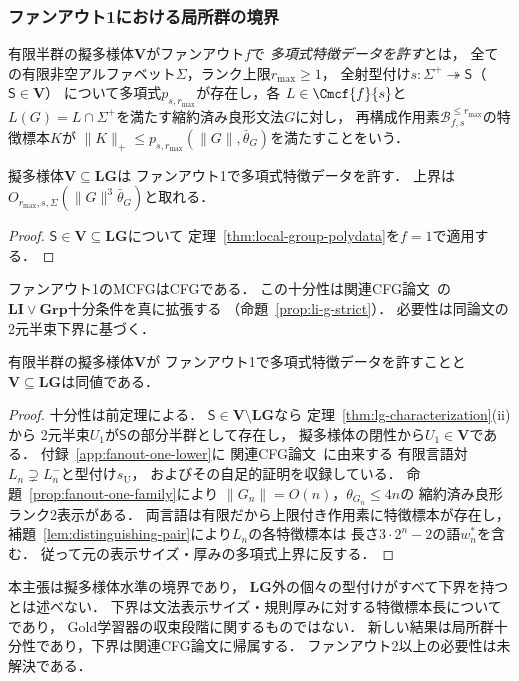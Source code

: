 \subsubsection{ファンアウト1における局所群の境界}
\label{subsec:fanout-one-boundary}
有限半群の擬多様体$\mathbf V$がファンアウト$f$で
\emph{多項式特徴データを許す}とは，
全ての有限非空アルファベット$\Sigma$，ランク上限$r_{\max}\ge1$，
全射型付け$s:\Sigma^+\twoheadrightarrow\mathsf S$（$\mathsf S\in\mathbf V$）
について多項式$p_{s,r_{\max}}$が存在し，各
$L\in\Cmcf{f}{s}$と
$L(G)=L\cap\Sigma^+$を満たす縮約済み良形文法$G$に対し，
再構成作用素$\mathcal B^{\le r_{\max}}_{f,s}$の特徴標本$K$が
$\|K\|_+\le p_{s,r_{\max}}(\|G\|,\bar\theta_G)$を満たすことをいう．

\begin{theorem}
\label{thm:fanout-one-lg}
擬多様体$\mathbf V\subseteq\mathbf{LG}$は
ファンアウト1で多項式特徴データを許す．
上界は$O_{r_{\max},s,\Sigma}(\|G\|^3\bar\theta_G)$と取れる．
\end{theorem}
\begin{proof}
$\mathsf S\in\mathbf V\subseteq\mathbf{LG}$について
定理~\ref{thm:local-group-polydata}を$f=1$で適用する．
\end{proof}
ファンアウト1のMCFGはCFGである．
この十分性は関連CFG論文~\cite{kuriyamaCFG}の
$\mathbf{LI}\vee\mathbf{Grp}$十分条件を真に拡張する
（命題~\ref{prop:li-g-strict}）．
必要性は同論文の2元半束下界に基づく．
\begin{corollary}
\label{cor:fanout-one-boundary}
有限半群の擬多様体$\mathbf V$が
ファンアウト1で多項式特徴データを許すことと
$\mathbf V\subseteq\mathbf{LG}$は同値である．
\end{corollary}
\begin{proof}
十分性は前定理による．
$\mathsf S\in\mathbf V\setminus\mathbf{LG}$なら
定理~\ref{thm:lg-characterization}(ii)から
2元半束$U_1$が$\mathsf S$の部分半群として存在し，
擬多様体の閉性から$U_1\in\mathbf V$である．
付録~\ref{app:fanout-one-lower}に
関連CFG論文~\cite[Proposition~6.4]{kuriyamaCFG}に由来する
有限言語対$L_n\supsetneq L_n^-$と型付け$s_{\mathrm U}$，
およびその自足的証明を収録している．
命題~\ref{prop:fanout-one-family}により
$\|G_n\|=O(n)$，$\theta_{G_n}\le4n$の
縮約済み良形ランク2表示がある．
両言語は有限だから上限付き作用素に特徴標本が存在し，
補題~\ref{lem:distinguishing-pair}により$L_n$の各特徴標本は
長さ$3\cdot2^n-2$の語$w_n^*$を含む．
従って元の表示サイズ・厚みの多項式上界に反する．
\end{proof}
\begin{remark}[境界主張の範囲]
\label{rem:fanout-one-scope}
本主張は擬多様体水準の境界であり，
$\mathbf{LG}$外の個々の型付けがすべて下界を持つとは述べない．
下界は文法表示サイズ・規則厚みに対する特徴標本長についてであり，
Gold学習器の収束段階に関するものではない．
新しい結果は局所群十分性であり，下界は関連CFG論文に帰属する．
ファンアウト2以上の必要性は未解決である．
\end{remark}
